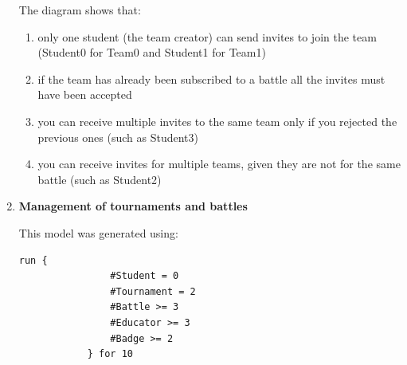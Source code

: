 \begin{enumerate}[label=,leftmargin=0cm]
            The diagram shows that:
            \begin{enumerate}
                  \item only one student (the team creator) can send invites
                        to join the team (Student0 for Team0 and Student1 for Team1)
                  \item if the team has already been subscribed to a battle
                        all the invites must have been accepted
                  \item you can receive multiple invites to the same team only
                        if you rejected the previous ones (such as Student3)
                  \item you can receive invites for multiple teams, given they are not
                        for the same battle (such as Student2)
            \end{enumerate}
            \pagebreak
      \item \textbf{Management of tournaments and battles}

            This model was generated using:
            \begin{lstlisting}[language=alloy]
            run {
                #Student = 0 
                #Tournament = 2
                #Battle >= 3
                #Educator >= 3
                #Badge >= 2
            } for 10
          \end{lstlisting}


\end{enumerate}
